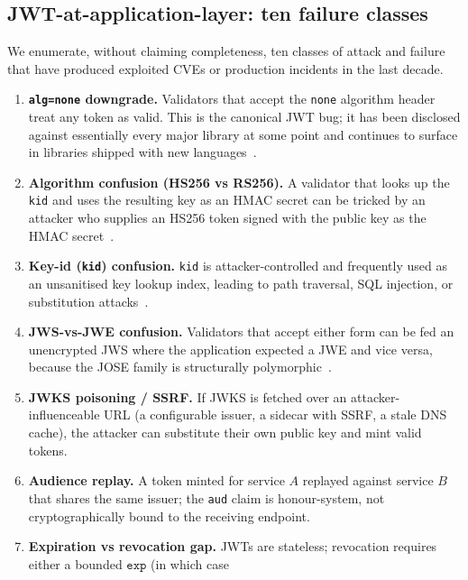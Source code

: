 \documentclass[11pt,a4paper]{article}
\theoremstyle{plain}
\theoremstyle{definition}
\begin{document}
\subsection{JWT-at-application-layer: ten failure classes}
\label{sec:jwt-tm}

We enumerate, without claiming completeness, ten classes of attack and
failure that have produced exploited CVEs or production incidents in the
last decade.

\begin{enumerate}[itemsep=2pt,topsep=2pt]
  \item \textbf{\texttt{alg=none} downgrade.} Validators that accept the
        \texttt{none} algorithm header treat any token as valid. This is the
        canonical JWT bug; it has been disclosed against essentially every
        major library at some point and continues to surface
        in libraries shipped with new languages~\cite{auth0algnone}.
  \item \textbf{Algorithm confusion (HS256 vs RS256).} A validator that
        looks up the \texttt{kid} and uses the resulting key as an HMAC
        secret can be tricked by an attacker who supplies an HS256 token
        signed with the public key as the HMAC secret~\cite{auth0algconf}.
  \item \textbf{Key-id (\texttt{kid}) confusion.} \texttt{kid} is
        attacker-controlled and frequently used as an unsanitised key
        lookup index, leading to path traversal, SQL injection, or
        substitution attacks~\cite{ietfjwtbcp}.
  \item \textbf{JWS-vs-JWE confusion.} Validators that accept either form
        can be fed an unencrypted JWS where the application expected a JWE
        and vice versa, because the JOSE family is structurally
        polymorphic~\cite{rfc7518}.
  \item \textbf{JWKS poisoning / SSRF.} If JWKS is fetched over an
        attacker-influenceable URL (a configurable issuer, a sidecar with
        SSRF, a stale DNS cache), the attacker can substitute their own
        public key and mint valid tokens.
  \item \textbf{Audience replay.} A token minted for service $A$ replayed
        against service $B$ that shares the same issuer; the
        \texttt{aud} claim is honour-system, not cryptographically bound to
        the receiving endpoint.
  \item \textbf{Expiration vs revocation gap.} JWTs are stateless;
        revocation requires either a bounded $\texttt{exp}$ (in which case

\end{enumerate}
\end{document}
